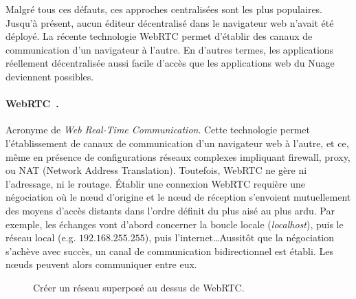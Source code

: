 Malgré tous ces défauts, ces approches centralisées sont les plus populaires.
Jusqu'à présent, aucun éditeur décentralisé dans le navigateur web n'avait été
déployé. La récente technologie WebRTC permet d'établir des canaux de
communication d'un navigateur à l'autre. En d'autres termes, les applications
réellement décentralisée aussi facile d'accès que les applications web du Nuage
deviennent possibles.

\paragraph{WebRTC~\cite{webrtc}.} Acronyme de \emph{Web Real-Time
  Communication}.  Cette technologie permet l'établissement de canaux de
communication d'un navigateur web à l'autre, et ce, même en présence de
configurations réseaux complexes impliquant firewall, proxy, ou NAT (Network
Address Translation). Toutefois, WebRTC ne gère ni l'adressage, ni le routage.
Établir une connexion WebRTC requière une négociation où le nœud d'origine et le
nœud de réception s'envoient mutuellement des moyens d'accès distants dans
l'ordre définit du plus aisé au plus ardu. Par exemple, les échanges vont
d'abord concerner la boucle locale (\emph{localhost}), puis le réseau local
(e.g. $192.168.255.255$), puis l'internet\ldots Aussitôt que la négociation
s'achève avec succès, un canal de communication bidirectionnel est établi. Les
nœuds peuvent alors communiquer entre eux.

\begin{figure*}
  \begin{center}
    \hspace{5pt}
    \hspace{5pt}
    \caption[Création d'un réseau superposé sur WebRTC]
    {\label{fig:webrtc}Créer un réseau superposé au dessus de WebRTC.}
  \end{center}
\end{figure*}

